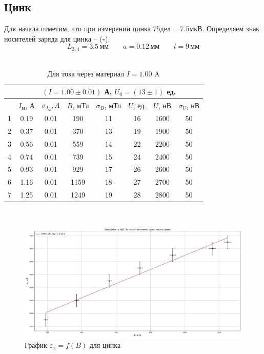 \documentclass[a4paper,12pt]{article}
\theoremstyle{definition}
\begin{document}
    \subsection{Цинк}
    Для начала отметим, что при измерении цинка $75\text{дел} = 7.5\text{мкВ}$.
    Определяем знак носителей заряда для цинка -- (\textbf{-}). \\
    $$L_{3,4} = 3.5\,\text{мм} \qquad a = 0.12\,\text{мм} \qquad l = 9\,\text{мм}$$ \\

    \begin{table}[H]
      \centering
      \caption{Для тока через материал $I = 1.00$ A}
      \label{tabular:zink1}
        \begin{tabular}{|c|c|c|c|c|c|c|c|} \hline
            & \multicolumn{7}{c|}{$(I = 1.00 \pm 0.01)$ А, \qquad $U_0 = (13 \pm 1)$ ед.} \\ \hline
            & $I_{\text{м}}$, А & $\sigma_{I_{\text{м}}}, A$ & $B$, мТл & $\sigma_B$, мТл & $U$, ед. & $U$, нВ & $\sigma_{U}$, нВ \\ \hline
          1 & 0.19 & 0.01 &  190 & 11 & 16 & 1600 & 50 \\ \hline
          2 & 0.37 & 0.01 &  370 & 13 & 19 & 1900 & 50 \\ \hline
          3 & 0.56 & 0.01 &  559 & 14 & 22 & 2200 & 50 \\ \hline
          4 & 0.74 & 0.01 &  739 & 15 & 24 & 2400 & 50 \\ \hline
          5 & 0.93 & 0.01 &  929 & 17 & 26 & 2600 & 50 \\ \hline
          6 & 1.16 & 0.01 & 1159 & 18 & 27 & 2700 & 50 \\ \hline
          7 & 1.25 & 0.01 & 1249 & 19 & 28 & 2800 & 50 \\ \hline
        \end{tabular}\\
    \end{table}

    \begin{figure}[h]
      \centering
        \includegraphics[scale=0.38]{graph-hall-zink.png}
      \caption{График $\varepsilon_x = f(B)$ для цинка}
    \end{figure}
\end{document}
